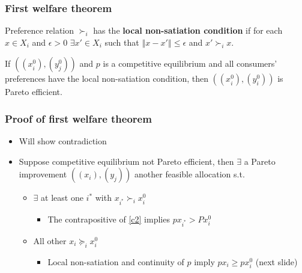 \documentclass[compress]{beamer}
\newcommand{\norm}[1]{\left\Vert {#1} \right\Vert}
\newcommand{\prefeq}{\succeq}
\newcommand{\pref}{\succ}
\begin{document}

\begin{frame}
  \frametitle{First welfare theorem}
  \begin{definition}
    Preference relation $\pref_i$ has the \textbf{local non-satiation
      condition} if for each $x \in X_i$ and $\epsilon > 0$ $\exists x'
    \in X_i$ such that $\norm{x - x'} \leq \epsilon $ and $x' \pref_i x$.
  \end{definition}
  
  \begin{theorem}
    If $((x_i^0),(y^0_j))$ and $p$ is a competitive equilibrium and all
    consumers' preferences have the local non-satiation condition, then
    $((x_i^0),(y_i^0))$ is Pareto efficient.
  \end{theorem}
\end{frame}  

\begin{frame}
  \frametitle{Proof of first welfare theorem}
  \begin{itemize}
  \item Will show contradiction
  \item Suppose competitive equilibrium not Pareto efficient, then
    $\exists$ a Pareto improvement $((x_i),(y_j))$ another feasible
    allocation s.t.
    \begin{itemize}
    \item $\exists $ at least one $i^*$ with $x_{i^*} \pref_i x_i^0$
      \begin{itemize}
      \item The contrapositive of \ref{c2} implies $p x_{i^*} > P
        x_i^0$
      \end{itemize}
    \item All other $x_i \prefeq_i x_i^0$ 
      \begin{itemize}
      \item Local non-satiation and continuity of $p$ imply $p x_i
        \geq p x_i^0$  (next slide)
      \end{itemize}
    \end{itemize}
  \end{itemize}
\end{frame}
\end{document}
